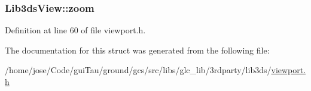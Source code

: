 \hypertarget{struct_lib3ds_view_a2ad83f13008d25be3ab7b6dc36809d73}{
\subsubsection[{zoom}]{ Lib3ds\-View\-::zoom}}\label{struct_lib3ds_view_a2ad83f13008d25be3ab7b6dc36809d73}


Definition at line 60 of file viewport.\-h.



The documentation for this struct was generated from the following file\-:\begin{DoxyCompactItemize}
\item 
/home/jose/\-Code/gui\-Tau/ground/gcs/src/libs/glc\-\_\-lib/3rdparty/lib3ds/\hyperlink{viewport_8h}{viewport.\-h}\end{DoxyCompactItemize}
